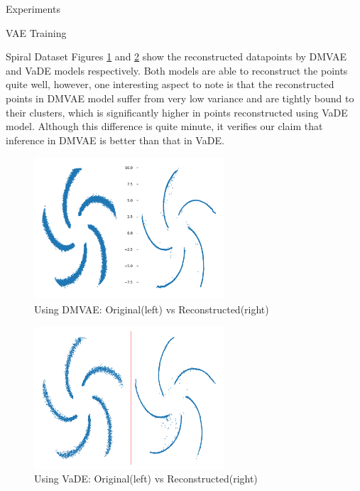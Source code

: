 \documentclass{article}
\begin{document}
\begin{psection}{Experiments}
\begin{psubsection}{VAE Training}
\begin{pssubsection}{Spiral Dataset}
			Figures \ref{fig:dmvae_spiral_regen} and \ref{fig:vade_spiral_regen} show the reconstructed datapoints by DMVAE and VaDE models respectively. Both models are able to reconstruct the points quite well, however, one interesting aspect to note is that the reconstructed points in DMVAE model suffer from very low variance and are tightly bound to their clusters, which is significantly higher in points reconstructed using VaDE model. Although this difference is quite minute, it verifies our claim that inference in DMVAE is better than that in VaDE.
			\begin{figure}[H]
				\centering
				\includegraphics[height=200px]{includes/plots/dmvae/spiral/regenerated.png}
				\caption{Using DMVAE: Original(left) vs Reconstructed(right)}
				\label{fig:dmvae_spiral_regen}
			\end{figure}
			\begin{figure}[H]
				\centering
				\includegraphics[height=200px]{includes/plots/vade/spiral/regenerated.png}
				\caption{Using VaDE: Original(left) vs Reconstructed(right)}
				\label{fig:vade_spiral_regen}
			\end{figure}


\end{pssubsection}
\end{psubsection}
\end{psection}
\end{document}

